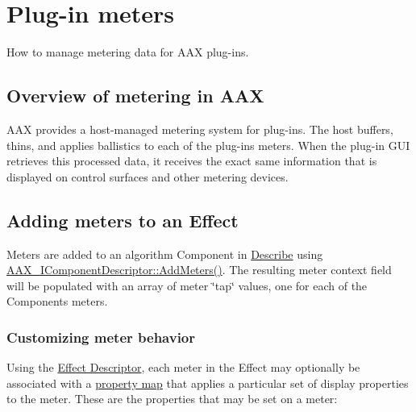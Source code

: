 \hypertarget{a00337}{}\section{Plug-\/in meters}
\label{a00337}
How to manage metering data for A\+A\+X plug-\/ins. 

\hypertarget{a00337_AdditionalFeatures_Meters_overview}{}\subsection{Overview of metering in A\+A\+X}\label{a00337_AdditionalFeatures_Meters_overview}
A\+A\+X provides a host-\/managed metering system for plug-\/ins. The host buffers, thins, and applies ballistics to each of the plug-\/in\textquotesingle{}s meters. When the plug-\/in G\+U\+I retrieves this processed data, it receives the exact same information that is displayed on control surfaces and other metering devices.\hypertarget{a00337_AdditionalFeatures_Meters_adding}{}\subsection{Adding meters to an Effect}\label{a00337_AdditionalFeatures_Meters_adding}
Meters are added to an algorithm Component in \hyperlink{a00326}{Describe} using \hyperlink{a00088_a5e4a61afa3d6510891e16d7179bdaa64}{A\+A\+X\+\_\+\+I\+Component\+Descriptor\+::\+Add\+Meters()}. The resulting meter context field will be populated with an array of meter \char`\"{}tap\char`\"{} values, one for each of the Component\textquotesingle{}s meters.\hypertarget{a00337_AdditionalFeatures_Meters_adding_properties}{}\subsubsection{Customizing meter behavior}\label{a00337_AdditionalFeatures_Meters_adding_properties}
Using the \hyperlink{a00096}{Effect Descriptor}, each meter in the Effect may optionally be associated with a \hyperlink{a00112}{property map} that applies a particular set of display properties to the meter. These are the properties that may be set on a meter\+:

